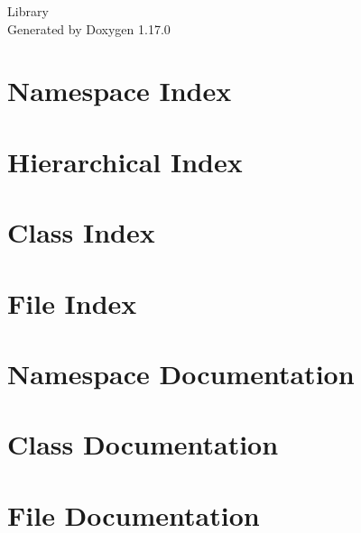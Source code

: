 \documentclass[twoside]{book}
\newcommand{\+}{\discretionary{\mbox{\scriptsize$\hookleftarrow$}}{}{}}
\newcommand{\clearemptydoublepage}{%
    \newpage{\pagestyle{empty}\cleardoublepage}%
  }
\begin{document}
  \raggedbottom
    \hypersetup{pageanchor=false,
                bookmarksnumbered=true,
                pdfencoding=unicode
               }
  \begin{titlepage}
  \vspace*{7cm}
  \begin{center}%
  {\Large Library}\\
  \vspace*{1cm}
  {\large Generated by Doxygen 1.17.0}\\
  \end{center}
  \end{titlepage}
  \clearemptydoublepage
  \tableofcontents
  \clearemptydoublepage
  \hypersetup{pageanchor=true}
\chapter{Namespace Index}

\chapter{Hierarchical Index}

\chapter{Class Index}

\chapter{File Index}

\chapter{Namespace Documentation}

\chapter{Class Documentation}






\chapter{File Documentation}








  \backmatter
  \newpage
  \clearemptydoublepage
  \printindex
\end{document}
